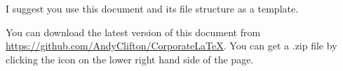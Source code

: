 I suggest you use this document and its file structure as a template.

You can download the latest version of this document from \href{https://github.com/AndyClifton/CorporateLaTeX}{https://github.com/AndyClifton/CorporateLaTeX}. You can get a .zip file by clicking the icon on the lower right hand side of the page.
